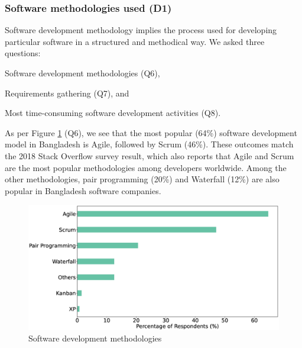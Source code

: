 \subsubsection{Software methodologies used (D1)}
\label{methodology}

Software development methodology implies the process used for developing
particular software in a structured and methodical
way. We asked three questions: \begin{inparaenum}
\item Software development methodologies (Q6),
\item Requirements gathering (Q7), and
\item Most time-consuming software development activities (Q8).
\end{inparaenum}

As per Figure \ref{fig:methodologies} (Q6), we see
that the most popular (64\%) software development model in Bangladesh is Agile, followed by Scrum (46\%). These outcomes match the 2018 Stack Overflow
survey \cite{StackoverflowSurvey2018} result, which also reports that Agile and Scrum
are the most popular methodologies among developers worldwide. Among the other methodologies, 
pair programming (20\%) and Waterfall (12\%) are also popular in Bangladesh software companies.
\begin{figure}[h]
\centering
  \includegraphics[scale=0.18]{Figures/Respondents_Methodology}
  \caption{Software development methodologies}
  \label{fig:methodologies}
\end{figure}

